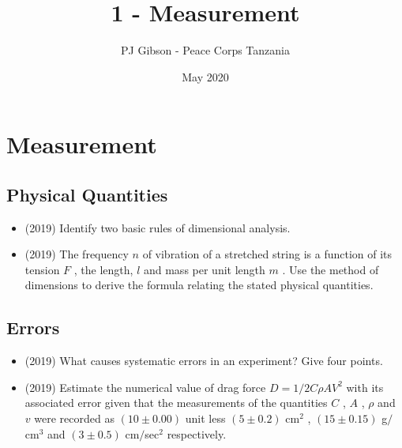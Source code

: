 \documentclass{article}
\title{1 - Measurement}
\author{PJ Gibson - Peace Corps Tanzania}
\date{May 2020}
\begin{document}
\maketitle


\section{Measurement}

\subsection{Physical Quantities}
\begin{itemize}
\item (2019)  Identify two basic rules of dimensional analysis.
\item (2019)  The frequency $ n$ of vibration of a stretched string is a function of its tension $ F$ , the length, $ l$ and mass per unit length $ m$ . Use the method of dimensions to derive the formula relating the stated physical quantities.
\end{itemize}

\subsection{Errors}
\begin{itemize}
\item (2019)  What causes systematic errors in an experiment? Give four points. 
\item (2019)  Estimate the numerical value of drag force $ D= 1/2 C \rho  A V^{2}$ with its associated error given that the measurements of the quantities $ C$ , $ A$ , $ \rho $ and $ v$ were recorded as $ (10\pm 0.00)$ unit less $ (5\pm 0.2) $ cm$ ^{2}$ , $ (15\pm 0.15)$ g$/$cm$ ^{3}$ and $ (3\pm 0.5)$ cm$/$sec$ ^{2}$ respectively. 
\end{itemize}
\end{document}
